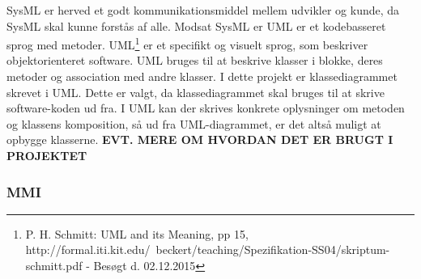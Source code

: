 \newline
SysML er herved et godt kommunikationsmiddel mellem udvikler og kunde, da SysML skal kunne forstås af alle. 
\newline
Modsat SysML er UML er et kodebasseret sprog med metoder.
UML\footnote{P. H. Schmitt: UML and its Meaning, pp 15, http://formal.iti.kit.edu/~beckert/teaching/Spezifikation-SS04/skriptum-schmitt.pdf - Besøgt d. 02.12.2015} er et specifikt og visuelt sprog, som beskriver objektorienteret software. UML bruges til at beskrive klasser i blokke, deres metoder og association med andre klasser. I dette projekt er klassediagrammet skrevet i UML. Dette er valgt, da klassediagrammet skal bruges til at skrive software-koden ud fra. I UML kan der skrives konkrete oplysninger om metoden og klassens komposition, så ud fra UML-diagrammet, er det altså muligt at opbygge klasserne. \textbf{EVT. MERE OM HVORDAN DET ER BRUGT I PROJEKTET}


\subsubsection{MMI}